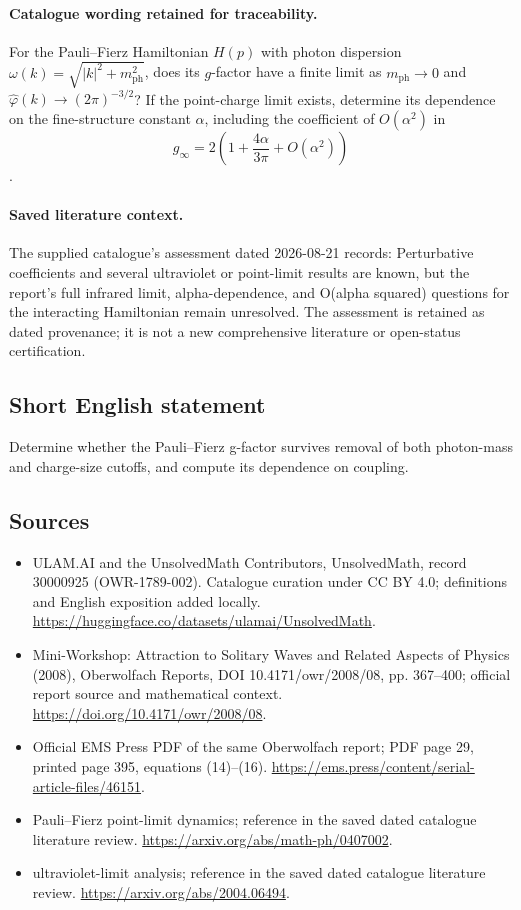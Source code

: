 \documentclass[11pt]{article}
\begin{document}
\paragraph{Catalogue wording retained for traceability.}
For the Pauli–Fierz Hamiltonian $H(p)$ with photon dispersion $\omega(k)=\sqrt{|k|^2+m_{\mathrm{ph}}^2}$, does its $g$-factor have a finite limit as $m_{\mathrm{ph}}\to0$ and $\widehat\varphi(k)\to(2\pi)^{-3/2}$? If the point-charge limit exists, determine its dependence on the fine-structure constant $\alpha$, including the coefficient of $O(\alpha^2)$ in $$g_\infty=2\left(1+\frac{4\alpha}{3\pi}+O(\alpha^2)\right)$$.

\paragraph{Saved literature context.} The supplied catalogue's assessment dated 2026-08-21 records: Perturbative coefficients and several ultraviolet or point-limit results are known, but the report's full infrared limit, alpha-dependence, and O(alpha squared) questions for the interacting Hamiltonian remain unresolved. The assessment is retained as dated provenance; it is not a new comprehensive literature or open-status certification.
\subsection{Short English statement}
Determine whether the Pauli--Fierz g-factor survives removal of both photon-mass and charge-size cutoffs, and compute its dependence on coupling.
\subsection{Sources}
\begin{itemize}
\item[\hypertarget{source:30000925:1}{S1}] ULAM.AI and the UnsolvedMath Contributors, UnsolvedMath, record 30000925 (OWR-1789-002). Catalogue curation under CC BY 4.0; definitions and English exposition added locally.
\url{https://huggingface.co/datasets/ulamai/UnsolvedMath}.
\item[\hypertarget{source:30000925:2}{S2}] Mini-Workshop: Attraction to Solitary Waves and Related Aspects of Physics (2008), Oberwolfach Reports, DOI 10.4171/owr/2008/08, pp. 367--400; official report source and mathematical context.
\url{https://doi.org/10.4171/owr/2008/08}.
\item[\hypertarget{source:30000925:3}{S3}] Official EMS Press PDF of the same Oberwolfach report; PDF page 29, printed page 395, equations (14)--(16).
\url{https://ems.press/content/serial-article-files/46151}.
\item[\hypertarget{source:30000925:4}{S4}] Pauli--Fierz point-limit dynamics; reference in the saved dated catalogue literature review.
\url{https://arxiv.org/abs/math-ph/0407002}.
\item[\hypertarget{source:30000925:5}{S5}] ultraviolet-limit analysis; reference in the saved dated catalogue literature review.
\url{https://arxiv.org/abs/2004.06494}.
\end{itemize}
\label{end:30000925}
\end{document}
